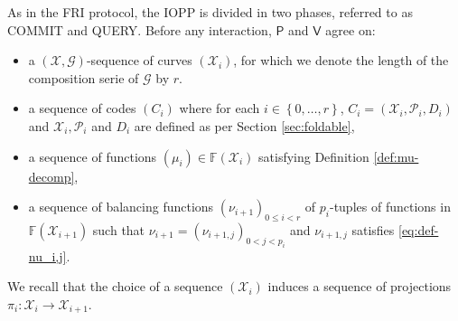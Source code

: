 \documentclass[a4paper,USenglish,autoref]{lipics-v2021}
\newcommand\F{\mathbb{F}}
\newcommand\prover{\mathsf{P}}
\newcommand\verifier{\mathsf{V}}
\renewcommand{\vec}[1]{\boldsymbol{#1}}
\newcommand{\set}[1]{\left\{#1\right\}}
\newcommand\calX{\mathcal{X}}
\newcommand\calP{\mathcal{P}}
\newcommand\calG{\mathcal{G}}
\newcommand\XGseq{(\calX, \vec{\calG})}
\begin{document}
As in the \textsf{FRI} protocol, the IOPP is divided in two phases, referred to as \textsf{COMMIT} and \textsf{QUERY}. 
Before any interaction, $\prover$ and $\verifier$ agree on:
\begin{itemize}
	\item a $\XGseq$-sequence of curves $(\calX_i)$, for which we denote the length of the composition serie of $\calG$ by $r$.
	\item a sequence of codes $(C_i)$ where for each $i \in \set{0, \dots, r}$, $C_i = (\calX_i, \calP_i, D_i)$ and $\calX_i, \calP_i$ and $D_i$ are defined as per Section \ref{sec:foldable},
	\item a sequence of functions $(\mu_i) \in \F(\calX_i)$ satisfying Definition \ref{def:mu-decomp},
	\item a sequence of balancing functions $(\nu_{i+1})_{0 \le i < r}$ of $p_i$-tuples of functions in $\F(\calX_{i+1})$ such that $\nu_{i+1} = (\nu_{i+1, j})_{0 < j < p_i}$ and $\nu_{i+1, j}$ satisfies \eqref{eq:def-nu_i,j}.
\end{itemize}
We recall that the choice of a sequence $(\calX_i)$ induces a sequence of projections $\pi_i : \calX_i \rightarrow \calX_{i+1}$.
\end{document}
